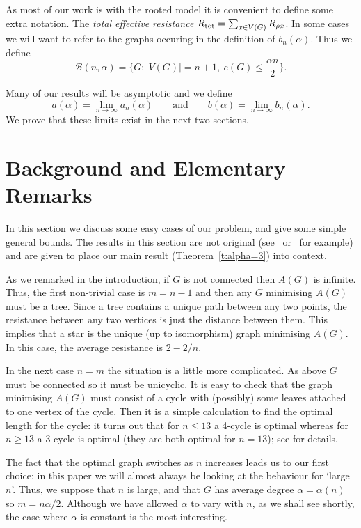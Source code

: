 \documentclass[11pt]{article}
\theoremstyle{remark}
\def\a{\alpha}
\newcommand\rtot{R_{{\rm tot}}}
\def\cB{\mathcal{B}}
\begin{document}
As most of our work is with the rooted model it is convenient
to define some extra notation. The
\emph{total effective resistance} $\rtot=\sum_{x\in V(G)}R_{\rho
  x}$. In some cases we will want to refer to the graphs occuring in
the definition of $b_n(\a)$. Thus we define
\[
\cB(n,\a)=\{G : |V(G)|=n+1,\ e(G)\le \frac{\alpha n}{2}\}.
\]

Many of our results will be asymptotic and we define
\[a(\a)=\lim_{n\to\infty}a_n(\a)\qquad\text{and}\qquad
b(\a)=\lim_{n\to\infty}b_n(\a).\] We prove that these limits exist in
the next two sections. 


\section{Background and Elementary Remarks}\label{s:easy-facts}
In this section we discuss some easy cases of our problem, and give
some simple general bounds. The results in this section are not
original (see~\cite{MR1105858} or~\cite{MR2409757} for
example) and are given to place our main result
(Theorem~\ref{t:alpha=3}) into context.

As we remarked in the introduction, if $G$ is not connected then
$A(G)$ is infinite.  Thus, the first non-trivial case is $m=n-1$ and
then any $G$ minimising $A(G)$ must be a tree. Since a tree contains a
unique path between any two points, the resistance between any two
vertices is just the distance between them. This implies that a star
is the unique (up to isomorphism) graph minimising $A(G)$.  In this
case, the average resistance is $2-2/n$.

In the next case $n=m$ the situation is a little more complicated. As
above $G$ must be connected so it must be unicyclic. It is easy to
check that the graph minimising $A(G)$ must consist of a cycle with
(possibly) some leaves attached to one vertex of the cycle. Then it is a simple 
calculation to find the optimal length for the cycle: it turns out
that for $n\le 13$ a 4-cycle is optimal whereas for $n\ge 13$ a
3-cycle is optimal (they are both optimal for $n=13$); see
\cite{MR2409757} for details.

The fact that the optimal graph switches as $n$ increases leads us to
our first choice: in this paper we will almost always be looking at
the behaviour for `large $n$'. Thus, we suppose that $n$ is large, and
that $G$ has average degree $\alpha=\alpha(n)$ so $m=n
\alpha/2$. Although we have allowed $\alpha$ to vary with $n$, as we
shall see shortly, the case where $\alpha$ is constant is the most
interesting.
\end{document}
